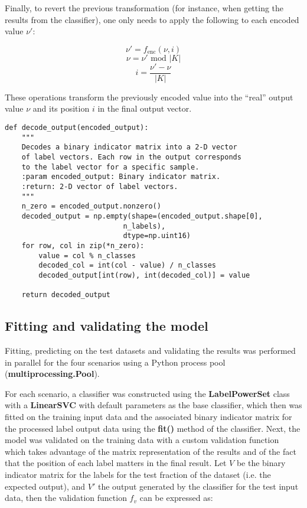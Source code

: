 \documentclass{kthreport}
\theoremstyle{definition}
\begin{document}
Finally, to revert the previous transformation (for instance, when getting the results from the classifier), one only needs to apply the following to each encoded value $\nu'$:

\[ \nu' = f_{\text{enc}}(\nu, i) \]
\[ \nu = \nu' \text{ mod } |K| \]
\[ i = \frac{\nu' - \nu}{|K|} \]

These operations transform the previously encoded value into the ``real'' output value $\nu$ and its position $i$ in the final output vector.

\begin{figure*}
	\begin{lstlisting}[style=MyPython, caption={Decoding function in Python, which takes a binary indicator matrix and extracts and decodes the encoded values within into the original data format.}, label={lst:decode}]
def decode_output(encoded_output):
	"""
	Decodes a binary indicator matrix into a 2-D vector 
	of label vectors. Each row in the output corresponds 
	to the label vector for a specific sample.
	:param encoded_output: Binary indicator matrix.
	:return: 2-D vector of label vectors.
	"""
	n_zero = encoded_output.nonzero()
	decoded_output = np.empty(shape=(encoded_output.shape[0],
							n_labels),
							dtype=np.uint16)
	for row, col in zip(*n_zero):
		value = col % n_classes
		decoded_col = int(col - value) / n_classes
		decoded_output[int(row), int(decoded_col)] = value
	
	return decoded_output
	\end{lstlisting}
\end{figure*}

\subsection{Fitting and validating the model}

Fitting, predicting on the test datasets and validating the results was performed in parallel for the four scenarios using a Python process pool (\textbf{multiprocessing.Pool}). 

For each scenario, a classifier was constructed using the \textbf{LabelPowerSet} class with a \textbf{LinearSVC} with default parameters as the base classifier, which then was fitted on the training input data and the associated binary indicator matrix for the processed label output data using the \textbf{fit()} method of the classifier.
Next, the model was validated on the training data with a custom validation function which takes advantage of the matrix representation of the results and of the fact that the position of each label matters in the final result. Let $V$ be the binary indicator matrix for the labels for the test fraction of the dataset (i.e. the expected output), and $V'$ the output generated by the classifier for the test input data, then the validation function $f_{v}$ can be expressed as:
\end{document}
